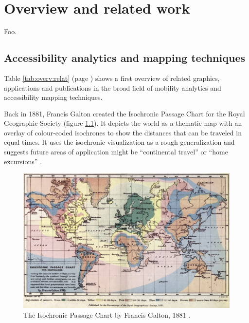 
\cleardoublepage
\chapter{Overview and related work}
  \label{chap:overv}

  Foo.\par

  \section{Accessibility analytics and mapping techniques}
    \label{sec:overv:accss}

    Table \ref{tab:overv:relat} (page \pageref{tab:overv:relat}) shows a first
    overview of related graphics, applications and publications in the broad
    field of mobility analytics and accessibility mapping techniques.\par

    Back in 1881, Francis Galton created the Isochronic Passage Chart for the
    Royal Geographic Society (figure \ref{fig:overv:isopc}). It depicts the world
    as a thematic map with an overlay of colour-coded isochrones to show the
    distances that can be traveled in equal times. It uses the isochronic
    visualization as a rough generalization and suggests future areas of
    application might be \enquote{continental travel} or \enquote{home
    excursions} \cite{galton1881construction}.\par

    \begin{figure}[htb]
      \centering
      \includegraphics[width=\linewidth]
        {./img/overv-isopc.jpg}
      \caption{The Isochronic Passage Chart by Francis Galton, 1881 \cite{galton1881construction}.}
      \label{fig:overv:isopc}
    \end{figure}

